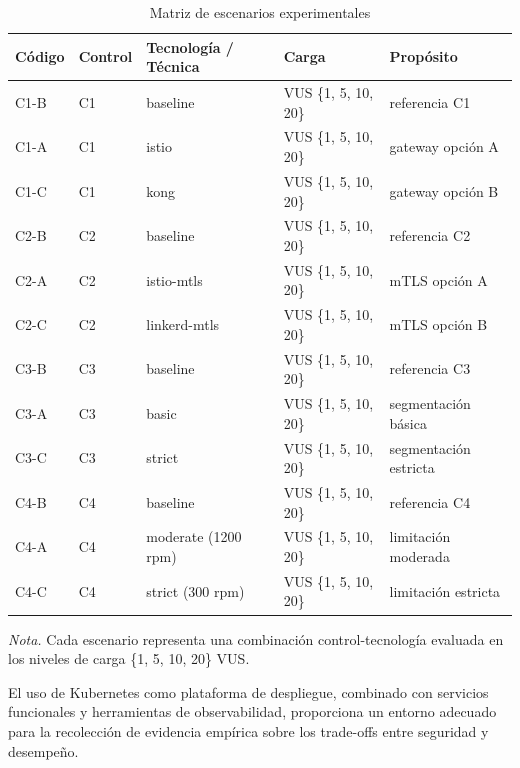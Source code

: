 \begin{table}[htbp]
    \centering
    \caption{Matriz de escenarios experimentales}
    
    \vspace{0.2cm}
    
    \begin{tabular}{lllll}
    \hline
    \textbf{Código} & \textbf{Control} & \textbf{Tecnología / Técnica} & \textbf{Carga} & \textbf{Propósito} \\
    \hline
    C1-B & C1 & baseline & VUS \{1, 5, 10, 20\} & referencia C1 \\
    C1-A & C1 & istio & VUS \{1, 5, 10, 20\} & gateway opción A \\
    C1-C & C1 & kong & VUS \{1, 5, 10, 20\} & gateway opción B \\
    C2-B & C2 & baseline & VUS \{1, 5, 10, 20\} & referencia C2 \\
    C2-A & C2 & istio-mtls & VUS \{1, 5, 10, 20\} & mTLS opción A \\
    C2-C & C2 & linkerd-mtls & VUS \{1, 5, 10, 20\} & mTLS opción B \\
    C3-B & C3 & baseline & VUS \{1, 5, 10, 20\} & referencia C3 \\
    C3-A & C3 & basic & VUS \{1, 5, 10, 20\} & segmentación básica \\
    C3-C & C3 & strict & VUS \{1, 5, 10, 20\} & segmentación estricta \\
    C4-B & C4 & baseline & VUS \{1, 5, 10, 20\} & referencia C4 \\
    C4-A & C4 & moderate (1200 rpm) & VUS \{1, 5, 10, 20\} & limitación moderada \\
    C4-C & C4 & strict (300 rpm) & VUS \{1, 5, 10, 20\} & limitación estricta \\
    \hline
    \end{tabular}

    \vspace{0.2cm}
    {\raggedright \small \textit{Nota.} Cada escenario representa una combinación control-tecnología evaluada en los niveles de carga \{1, 5, 10, 20\} VUS. \par}
    
    \label{tab:matriz_escenarios}
\end{table}
\FloatBarrier

El uso de Kubernetes como plataforma de despliegue, combinado con servicios funcionales y herramientas de observabilidad, proporciona un entorno adecuado para la recolección de evidencia empírica sobre los trade-offs entre seguridad y desempeño.

